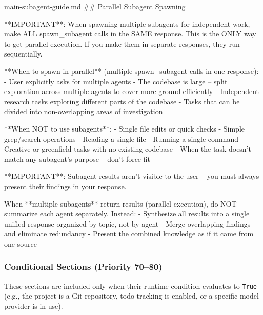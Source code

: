 \begin{prompttemplate}{main-subagent-guide.md}
## Parallel Subagent Spawning

**IMPORTANT**: When spawning multiple subagents for independent work, make
ALL spawn_subagent calls in the SAME response. This is the ONLY way to get
parallel execution. If you make them in separate responses, they run
sequentially.

**When to spawn in parallel** (multiple spawn_subagent calls in one
response):
- User explicitly asks for multiple agents
- The codebase is large -- split exploration across multiple agents to
  cover more ground efficiently
- Independent research tasks exploring different parts of the codebase
- Tasks that can be divided into non-overlapping areas of investigation

**When NOT to use subagents**:
- Single file edits or quick checks
- Simple grep/search operations
- Reading a single file
- Running a single command
- Creative or greenfield tasks with no existing codebase
- When the task doesn't match any subagent's purpose -- don't force-fit

**IMPORTANT**: Subagent results aren't visible to the user -- you must
always present their findings in your response.

When **multiple subagents** return results (parallel execution), do NOT
summarize each agent separately. Instead:
- Synthesize all results into a single unified response organized by
  topic, not by agent
- Merge overlapping findings and eliminate redundancy
- Present the combined knowledge as if it came from one source
\end{prompttemplate}

\subsubsection{Conditional Sections (Priority 70--80)}
\label{app:tpl_conditional}

These sections are included only when their runtime condition evaluates to \texttt{True} (e.g., the project is a Git repository, todo tracking is enabled, or a specific model provider is in use).

